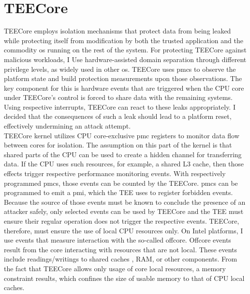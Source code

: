 \section{TEECore}
\label{sec:30:tee_kernel}
TEECore employs isolation mechanisms that protect data from being leaked while
protecting itself from modification by both the trusted application and the
commodity \gls{os} running on the rest of the system. For protecting TEECore
against malicious workloads, I Use hardware-assisted domain separation through
different privilege levels, as widely used in other \gls{os}. TEECore uses
\glspl{pmc} to observe the platform state and build protection measurements upon
those observations. The key component for this is hardware events that are
triggered when the CPU core under TEECore's control is forced to share data with
the remaining systems. Using respective interrupts, TEECore can react to these
leaks appropriately. I decided that the consequences of such a leak should lead
to a platform reset, effectively undermining an attack attempt.\\

TEECore kernel utilizes CPU core-exclusive \gls{pmc} registers to monitor data
flow between cores for isolation. The assumption on this part of the kernel is
that shared parts of the CPU can be used to create a hidden channel for
transferring data. If the CPU uses such resources, for example, a shared L3
cache, then those effects trigger respective performance monitoring events. With
respectively programmed \glspl{pmc}, those events can be counted by the TEECore.
\glspl{pmc} can be programmed to emit a \gls{pmi}, which the TEE uses to
register forbidden events. Because the source of those events must be known to
conclude the presence of an attacker safely, only selected events can be used by
TEECore and the TEE must ensure their regular operation does not trigger the
respective events. TEECore, therefore, must ensure the use of local CPU
resources only. On Intel platforms, I use events that measure interaction with
the so-called offcore. Offcore events result from the core interacting with
resources that are not local. These events include readings/writings to shared
caches , RAM, or other components. From the fact that TEECore allows only usage
of core local resources, a memory constraint results, which confines the size of
usable memory to that of CPU local caches.\\

